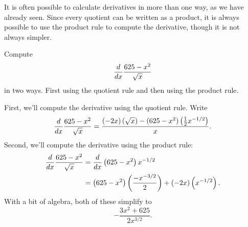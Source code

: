 It is often possible to calculate derivatives in more than one way, as
we have already seen. Since every quotient can be written as a
product, it is always possible to use the product rule to compute the
derivative, though it is not always simpler.

\begin{example}
Compute 
\[
\frac{d}{dx} \frac{625-x^2}{\sqrt{x}}
\] 
in two ways. First using the quotient rule and then using the product
rule.
\end{example}

\begin{solution} 
First, we'll compute the derivative using the quotient rule. Write
\[
\frac{d}{dx} \frac{625-x^2}{\sqrt{x}} = \frac{\left(-2x\right)\left(\sqrt{x}\right) - (625-x^2)\left(\frac{1}{2}x^{-1/2}\right)}{x}.
\]
Second, we'll compute the derivative using the product rule:
\begin{align*}
\frac{d}{dx} \frac{625-x^2}{\sqrt{x}} &= \frac{d}{dx} \left(625-x^2\right)x^{-1/2}\\
&=\left(625-x^2\right)\left(\frac{-x^{-3/2}}{2}\right)+ (-2x)\left(x^{-1/2}\right).
\end{align*}
With a bit of algebra, both of these simplify to
\[
-\frac{3x^2+625}{2x^{3/2}}.
\]
\end{solution}


